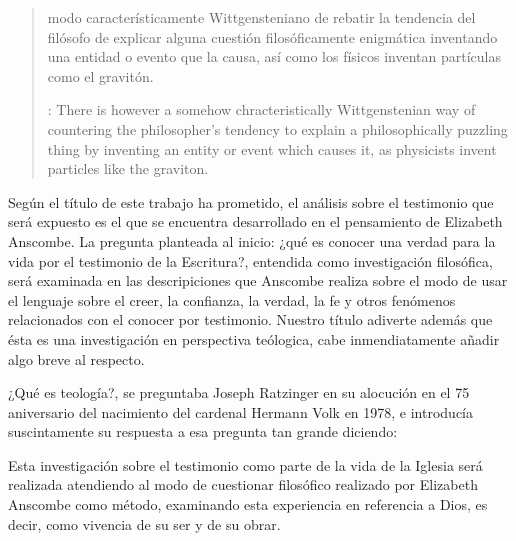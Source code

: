 \blockquote[{\cite[xix]{anscombe2011plato}}: There is however a somehow
chracteristically Wittgenstenian way of countering the philosopher's tendency to
explain a philosophically puzzling thing by inventing an entity or event which
causes it, as physicists invent particles like the graviton.]{modo
  característicamente Wittgensteniano de rebatir la tendencia del filósofo de
  explicar alguna cuestión filosóficamente enigmática inventando una entidad o
  evento que la causa, así como los físicos inventan partículas como el
  gravitón.}

Según el título de este trabajo ha prometido, el análisis sobre el testimonio
que será expuesto es el que se encuentra desarrollado en el pensamiento de
Elizabeth Anscombe. La pregunta planteada al inicio: ¿qué es conocer una verdad
para la vida por el testimonio de la Escritura?, entendida como investigación
filosófica, será examinada en las descripiciones que Anscombe realiza sobre el
modo de usar el lenguaje sobre el creer, la confianza, la verdad, la fe y otros
fenómenos relacionados con el conocer por testimonio. Nuestro título adiverte
además que ésta es una investigación en perspectiva teólogica, cabe
inmendiatamente añadir algo breve al respecto.

¿Qué es teología?, se preguntaba Joseph Ratzinger en su alocución en el 75
aniversario del nacimiento del cardenal Hermann Volk en 1978, e introducía
suscintamente su respuesta a esa pregunta tan grande diciendo:

 Esta investigación sobre el testimonio como parte de la vida de la
Iglesia será realizada atendiendo al modo de cuestionar filosófico realizado por
Elizabeth Anscombe como método, examinando esta experiencia en referencia a
Dios, es decir, como vivencia de su ser y de su obrar.

